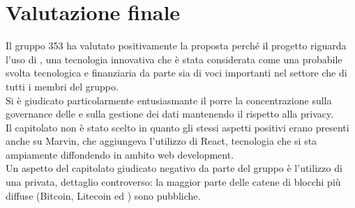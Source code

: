 \documentclass[StudioDiFattibilità.tex]{subfiles}
\begin{document}
\section{Valutazione finale}
Il gruppo 353 ha valutato positivamente la proposta perché il progetto riguarda l'uso di , una tecnologia innovativa che è stata considerata come una probabile svolta tecnologica e finanziaria da parte sia di voci importanti nel settore che di tutti i membri del gruppo.\\
Si è giudicato particolarmente entusiasmante il porre la concentrazione sulla governance delle  e sulla gestione dei dati mantenendo il rispetto alla privacy.\\
Il capitolato non è stato scelto in quanto gli stessi aspetti positivi erano presenti anche su Marvin, che aggiungeva l'utilizzo di React, tecnologia che si sta ampiamente diffondendo in ambito web development.\\
Un aspetto del capitolato giudicato negativo da parte del gruppo è l'utilizzo di una  privata, dettaglio controverso: la maggior parte delle catene di blocchi più diffuse (Bitcoin, Litecoin ed ) sono pubbliche.
\end{document}
